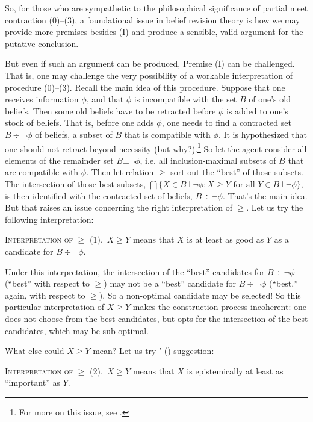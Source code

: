 So, for those who are sympathetic to the philosophical significance of partial meet contraction ($0$)--($3$), a foundational issue in belief revision theory is how we may provide more premises besides (I) and produce a sensible, valid argument for the putative conclusion.

But even if such an argument can be produced, Premise (I) can be challenged. That is, one may challenge the very possibility of a workable interpretation of procedure ($0$)--($3$). Recall the main idea of this procedure. Suppose that one receives information $\phi$, and that $\phi$ is incompatible with the set $B$ of one's old beliefs. Then some old beliefs have to be retracted before $\phi$ is added to one's stock of beliefs. That is, before one adds $\phi$, one needs to find a contracted set $B \div \neg\phi$ of beliefs, a subset of $B$ that is compatible with $\phi$. It is hypothesized that one should not retract beyond necessity (but why?).\footnote
	{For more on this issue, see \citet{rott2000two}.} 
So let the agent consider all elements of the remainder set $B\bot\neg\phi$, i.e. all inclusion-maximal subsets of $B$ that are compatible with $\phi$. Then let relation $\geq$  sort out the ``best'' of those subsets. The intersection of those best subsets, $\bigcap \{ X \in B\bot\neg\phi : X \ge Y \mbox{ for all } Y \in B\bot\neg\phi \}$, is then identified with the contracted set of beliefs, $B \div \neg\phi$. That's the main idea. But that raises an issue concerning the right interpretation of $\ge$. Let us try the following interpretation:\op

	\xm \textsc{Interpretation of $\ge$ (1).}\, $X \ge Y$ means that $X$ is at least as good as $Y$ as a candidate for $B \div \neg\phi$.

\ed Under this interpretation, the intersection of the ``best'' candidates for $B \div \neg\phi$ (``best'' with respect to $\geq$) may not be a ``best'' candidate for $B \div \neg\phi$ (``best,'' again, with respect to $\geq$). So a non-optimal candidate may be selected! So this particular interpretation of $X \ge Y$ makes the construction process incoherent: one does not choose from the best candidates, but opts for the intersection of the best candidates, which may be sub-optimal.  

What else could $X \ge Y$ mean? Let us try \citeauthor{gardenfors1984epistemic}' () suggestion:\op

	\xm \textsc{Interpretation of $\ge$ (2).}\, $X \ge Y$ means that $X$ is epistemically at least as ``important'' as $Y$.

